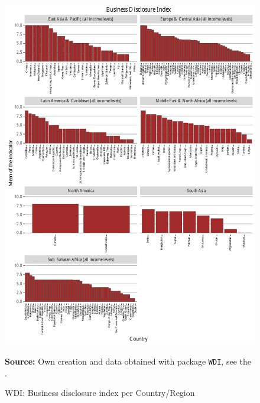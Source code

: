 \begin{figure}[H]
\begin{center}
\caption{WDI: Business disclosure index per Country/Region}
\label{fig_wdi_disclo}
\includegraphics[max height=.9\textheight]{../img/wdi_business_disclosure_index.pdf}
\end{center}
\noindent \footnotesize{\textbf{Source:} Own creation and data obtained with package \texttt{WDI}, see the \cite{wb_r}.}
\end{figure}

